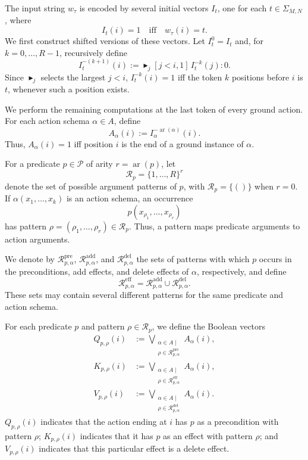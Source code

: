 The input string $w_\tau$ is encoded by several initial vectors $I_t$, one for each
$t\in\Sigma_{M,N}$, where
\[
I_t(i)=1
\quad\text{iff}\quad
w_\tau(i)=t.
\]
We first construct shifted versions of these vectors. Let $I_t^0=I_t$ and,
for $k=0,\ldots,R-1$, recursively define
\begin{equation}
I_t^{-(k+1)}(i)
:=
\blacktriangleright_j
[j<i,1]\,
I_t^{-k}(j):0.
\label{eq:brasp-shift}
\end{equation}
Since $\blacktriangleright_j$ selects the largest $j<i$,
$I_t^{-k}(i)=1$ iff the token $k$ positions before $i$ is $t$, whenever
such a position exists.

We perform the remaining computations at the last token of every ground
action. For each action schema $\alpha\in A$, define
\begin{equation}
A_\alpha(i)
:=
I_\alpha^{-\operatorname{ar}(\alpha)}(i).
\label{eq:brasp-action}
\end{equation}
Thus, $A_\alpha(i)=1$ iff position $i$ is the end of a ground instance of
$\alpha$.

For a predicate $p\in\mathcal{P}$ of arity
$r=\operatorname{ar}(p)$, let
\[
\mathcal{R}_p
=
\{1,\ldots,R\}^{r}
\]
denote the set of possible argument patterns of $p$, with
$\mathcal{R}_p=\{()\}$ when $r=0$. If
$\alpha(x_1,\ldots,x_k)$ is an action schema, an occurrence
\[
p(x_{\rho_1},\ldots,x_{\rho_r})
\]
has pattern
$\rho=(\rho_1,\ldots,\rho_r)\in\mathcal{R}_p$.
Thus, a pattern maps predicate arguments to action arguments.

We denote by
$\mathcal{R}^{\mathrm{pre}}_{p,\alpha}$,
$\mathcal{R}^{\mathrm{add}}_{p,\alpha}$, and
$\mathcal{R}^{\mathrm{del}}_{p,\alpha}$
the sets of patterns with which $p$ occurs in the preconditions, add effects,
and delete effects of $\alpha$, respectively, and define
\[
\mathcal{R}^{\mathrm{eff}}_{p,\alpha}
=
\mathcal{R}^{\mathrm{add}}_{p,\alpha}
\cup
\mathcal{R}^{\mathrm{del}}_{p,\alpha}.
\]
These sets may contain several different patterns for the same predicate and
action schema.

For each predicate $p$ and pattern $\rho\in\mathcal{R}_p$, we define the
Boolean vectors
\begin{equation}
\begin{aligned}
Q_{p,\rho}(i)
&:=
\bigvee_{\substack{
\alpha\in A\mid\\
\rho\in\mathcal{R}^{\mathrm{pre}}_{p,\alpha}
}}
A_\alpha(i),
\\
K_{p,\rho}(i)
&:=
\bigvee_{\substack{
\alpha\in A\mid\\
\rho\in\mathcal{R}^{\mathrm{eff}}_{p,\alpha}
}}
A_\alpha(i),
\\
V_{p,\rho}(i)
&:=
\bigvee_{\substack{
\alpha\in A\mid\\
\rho\in\mathcal{R}^{\mathrm{del}}_{p,\alpha}
}}
A_\alpha(i).
\end{aligned}
\label{eq:brasp-lifted-qkv}
\end{equation}
$Q_{p,\rho}(i)$ indicates that the action ending at $i$ has $p$ as
a precondition with pattern $\rho$; $K_{p,\rho}(i)$ indicates that it
has $p$ as an effect with pattern $\rho$; and $V_{p,\rho}(i)$ indicates that this
particular effect is a delete effect.

